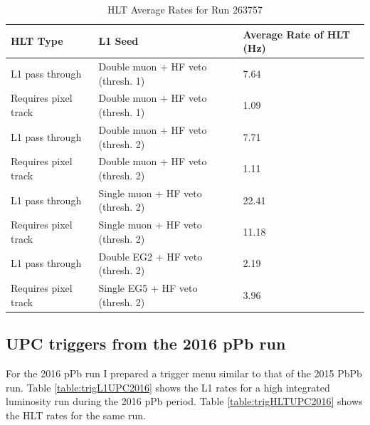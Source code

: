 \begin{table}[h!]
\centering
\caption{HLT Average Rates for Run 263757}
\label{table:trigHLTUPC2015}
\begin{tabular}{@{}lll@{}}
\toprule
HLT Type             & L1 Seed                           & Average Rate of HLT (Hz) \\ \midrule
L1 pass through      & Double muon + HF veto (thresh. 1) & 7.64                     \\
Requires pixel track & Double muon + HF veto (thresh. 1) & 1.09                     \\
L1 pass through      & Double muon + HF veto (thresh. 2) & 7.71                     \\
Requires pixel track & Double muon + HF veto (thresh. 2) & 1.11                     \\
L1 pass through      & Single muon + HF veto (thresh. 2) & 22.41                    \\
Requires pixel track & Single muon + HF veto (thresh. 2) & 11.18                    \\
L1 pass through      & Double EG2 + HF veto (thresh. 2)  & 2.19                     \\
Requires pixel track & Single EG5 + HF veto (thresh. 2)  & 3.96                     \\ \bottomrule
\end{tabular}
\end{table}

\subsection{UPC triggers from the 2016 pPb run}

For the 2016 pPb run I prepared a trigger menu similar to that of the 2015 PbPb run. Table \ref{table:trigL1UPC2016} shows the L1 rates for a high integrated luminosity run during the 2016 pPb period. Table \ref{table:trigHLTUPC2016} shows the HLT rates for the same run. 

